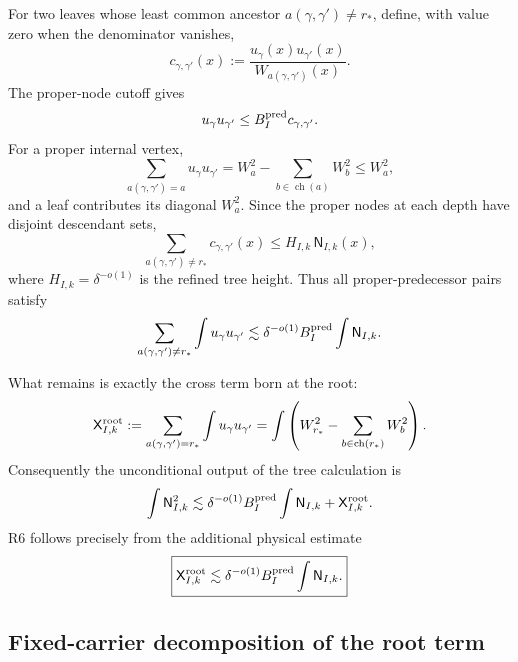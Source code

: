 \documentclass[11pt]{article}
\begin{document}
For two leaves whose least common ancestor
\(a(\gamma,\gamma')\ne r_\ast\), define, with value zero when the denominator
vanishes,
\begin{equation}\label{eq:lca-positive-charge}
 c_{\gamma,\gamma'}(x)
 :=
 \frac{u_\gamma(x)u_{\gamma'}(x)}
      {W_{a(\gamma,\gamma')}(x)}.
\end{equation}
The proper-node cutoff gives
\begin{equation}\label{eq:r6-pair-charge}
 u_\gamma u_{\gamma'}
 \le B_I^{\rm pred}c_{\gamma,\gamma'}.
\end{equation}
For a proper internal vertex,
\[
 \sum_{a(\gamma,\gamma')=a}u_\gamma u_{\gamma'}
 =W_a^2-\sum_{b\in\operatorname{ch}(a)}W_b^2
 \le W_a^2,
\]
and a leaf contributes its diagonal \(W_a^2\).  Since the proper nodes at
each depth have disjoint descendant sets,
\begin{equation}\label{eq:r6-no-repeat-charge}
 \sum_{a(\gamma,\gamma')\ne r_\ast}
 c_{\gamma,\gamma'}(x)
 \le
 H_{I,k}\,\mathsf N_{I,k}(x),
\end{equation}
where \(H_{I,k}=\delta^{-o(1)}\) is the refined tree height.  Thus all
proper-predecessor pairs satisfy
\[
 \sum_{a(\gamma,\gamma')\ne r_\ast}
 \int u_\gamma u_{\gamma'}
 \lesssim
 \delta^{-o(1)}B_I^{\rm pred}\int\mathsf N_{I,k}.
\]

What remains is exactly the cross term born at the root:
\begin{equation}\label{eq:root-cross-energy}
 \mathsf X^{\rm root}_{I,k}
 :=
 \sum_{a(\gamma,\gamma')=r_\ast}
 \int u_\gamma u_{\gamma'}
 =
 \int\left(
  W_{r_\ast}^2-
  \sum_{b\in\operatorname{ch}(r_\ast)}W_b^2
 \right).
\end{equation}
Consequently the unconditional output of the tree calculation is
\begin{equation}\label{eq:r6-root-reduction}
 \int\mathsf N_{I,k}^2
 \lesssim
 \delta^{-o(1)}B_I^{\rm pred}\int\mathsf N_{I,k}
 +\mathsf X^{\rm root}_{I,k}.
\end{equation}
R6 follows precisely from the additional physical estimate
\begin{equation}\label{eq:root-cross-energy-gate}
 \boxed{
 \mathsf X^{\rm root}_{I,k}
 \lesssim
 \delta^{-o(1)}B_I^{\rm pred}
 \int\mathsf N_{I,k}.}
\end{equation}

\subsection{Fixed-carrier decomposition of the root term}
\end{document}
